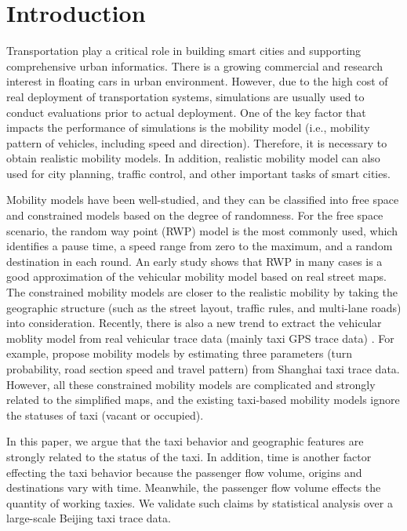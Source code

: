 \section{Introduction}
\label{section_introduction}

Transportation play a critical role in building smart cities and supporting comprehensive urban informatics. There is a growing commercial and research interest in floating cars in urban environment. However, due to the high cost of real deployment of transportation systems, simulations are usually used to conduct evaluations prior to actual deployment. One of the key factor that impacts the performance of simulations is the mobility model (i.e., mobility pattern of vehicles, including speed and direction). Therefore, it is necessary to obtain realistic mobility models. In addition, realistic mobility model can also used for city planning, traffic control, and other important tasks of smart cities.

Mobility models \cite{LuChen-104,AhmedKarmakar-106} have been well-studied, and they can be classified into free space and constrained models based on the degree of randomness.
For the free space scenario, the random way point (RWP) model \cite{broch1998performance} is the most commonly used, which identifies a pause time, a speed range from zero to the maximum, and a random destination in each round. An early study \cite{SahaJohnson-91} shows that RWP in many cases is a good approximation of the vehicular mobility model based on real street maps. The constrained mobility models \cite{SahaJohnson-91,MartinezCano-87,ChoffnesBustamante-93}  are closer to the realistic mobility by taking the geographic structure (such as the street layout, traffic rules, and multi-lane roads) into consideration. Recently, there is also a new trend to extract the vehicular moblity model from real vehicular trace data (mainly taxi GPS trace data) \cite{KimKotz-99,HuangZhu-88}. For example, \cite{HuangZhu-88} propose mobility models by estimating three parameters (turn probability, road section speed and travel pattern) from Shanghai taxi trace data. However, all these constrained mobility models are complicated and strongly related to the simplified maps, and the existing taxi-based mobility models ignore the statuses of taxi (vacant or occupied).

In this paper, we argue that the taxi behavior and geographic features are strongly related to the status of the taxi. In addition, time is another factor effecting the taxi behavior because the passenger flow volume, origins and destinations vary with time. Meanwhile, the passenger flow volume effects the quantity of working taxies. We validate such claims by statistical analysis over a large-scale Beijing taxi trace data. 

